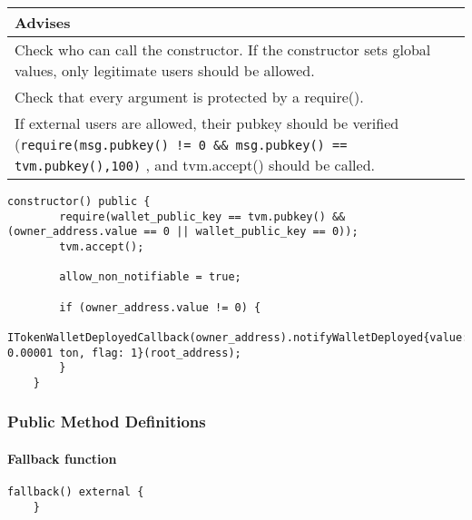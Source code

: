 
\ifsoldraft
\noindent\begin{tabular}{|p{12cm}|}\hline
\rowcolor{green}Advises
\\\hline
Check who can call the constructor. If the constructor sets global values, only legitimate users should be allowed.
\\\hline
Check that every argument is protected by a require().
\\\hline
If external users are allowed, their pubkey should be verified (\verb+require(msg.pubkey() != 0 && msg.pubkey() == tvm.pubkey(),100)+ , and tvm.accept() should be called.
\\\hline\end{tabular}
\fi
\vspace{2cm}

\begin{lstlisting}[firstnumber=43]
    constructor() public {
        require(wallet_public_key == tvm.pubkey() && (owner_address.value == 0 || wallet_public_key == 0));
        tvm.accept();

        allow_non_notifiable = true;

        if (owner_address.value != 0) {
            ITokenWalletDeployedCallback(owner_address).notifyWalletDeployed{value: 0.00001 ton, flag: 1}(root_address);
        }
    }
\end{lstlisting}

\subsubsection{Public Method Definitions}


\paragraph{Fallback function}

\vspace{2cm}

\begin{lstlisting}[firstnumber=683]
    fallback() external {
    }
\end{lstlisting}

